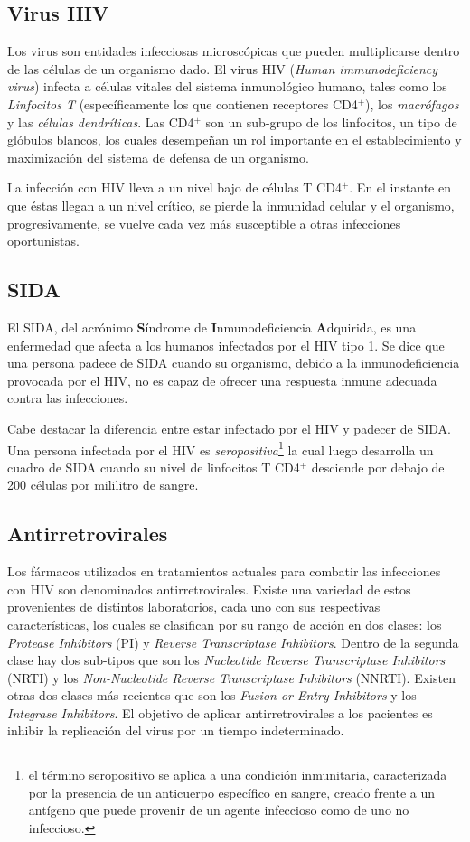   \subsection{Virus HIV}
  Los virus son entidades infecciosas microsc\'opicas que pueden multiplicarse dentro de las c\'elulas de un organismo dado. El virus HIV (\emph{Human immunodeficiency virus}) infecta a c\'elulas vitales del sistema inmunol\'ogico humano, tales como los \textit{Linfocitos T} (espec\'ificamente los que contienen receptores CD4$^+$), los \textit{macr\'ofagos} y las \textit{c\'elulas dendr\'iticas}. Las CD4$^+$ son un sub-grupo de los linfocitos, un tipo de gl\'obulos
  blancos, los cuales desempe\~nan un rol importante en el establecimiento y maximizaci\'on del sistema de defensa de un organismo.

  La infecci\'on con HIV lleva a un nivel bajo de c\'elulas T CD4$^+$. En el instante en que \'estas llegan a un nivel cr\'itico, se pierde la
  inmunidad celular y el organismo, progresivamente, se vuelve cada vez m\'as susceptible a otras infecciones oportunistas.

  \subsection{SIDA}
  El SIDA, del acr\'onimo \textbf{S}\'indrome de \textbf{I}nmunodeficiencia \textbf{A}dquirida, es una enfermedad que afecta a los humanos infectados
  por el HIV tipo 1. Se dice que una persona padece de SIDA cuando su organismo, debido a la inmunodeficiencia provocada por el HIV, no es capaz de ofrecer
  una respuesta inmune adecuada contra las infecciones.

  Cabe destacar la diferencia entre estar infectado por el HIV y padecer de SIDA. Una persona infectada por el HIV es \textit{seropositiva}\footnote{el
  t\'ermino seropositivo se aplica a una condici\'on inmunitaria, caracterizada por la presencia de un anticuerpo espec\'ifico en sangre, creado frente
  a un ant\'igeno que puede provenir de un agente infeccioso como de uno no infeccioso.} la cual luego desarrolla un cuadro de SIDA cuando su nivel de
  linfocitos T CD4$^+$ desciende por debajo de 200 c\'elulas por mililitro de sangre.

  \subsection{Antirretrovirales}
  Los f\'armacos utilizados en tratamientos actuales para combatir las infecciones con HIV son denominados antirretrovirales. Existe una variedad de estos
  provenientes de distintos laboratorios, cada uno con sus respectivas caracter\'isticas, los cuales se clasifican por su rango de acci\'on en dos clases: los \emph{Protease Inhibitors} (PI) y \emph{Reverse Transcriptase Inhibitors}. Dentro de la segunda clase hay dos sub-tipos que son los \emph{Nucleotide Reverse Transcriptase Inhibitors} (NRTI) y los \emph{Non-Nucleotide Reverse Transcriptase Inhibitors} (NNRTI). Existen otras dos clases m\'as recientes que son los \emph{Fusion or Entry Inhibitors} y los \emph{Integrase Inhibitors}. El objetivo de aplicar antirretrovirales a los pacientes es inhibir la replicaci\'on del virus por un tiempo indeterminado.

